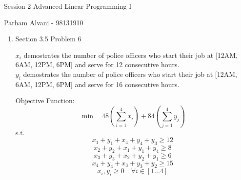 \documentclass{article}
\begin{document}
\large %


{\Large Session 2 %
\hfill  Advanced Linear Programming I}

\begin{center}
{\Large Parham Alvani - 98131910} %
\end{center}
\vspace{0.05in}


\begin{enumerate}

\item Section 3.5 Problem 6
\par
\(x_i\) demostrates the number of police officers who start their job at [12AM, 6AM, 12PM, 6PM] and serve for 12 consecutive hours.\\
\(y_i\) demostrates the number of police officers who start their job at [12AM, 6AM, 12PM, 6PM] and serve for 16 consecutive hours.
\par
Objective Function:
\[
    \min\quad48(\sum_{i=1}^{4}x_i) + 84(\sum_{j=1}^4y_j)
\]
s.t.
\[
    x_1 + y_1 + x_4 + y_4 + y_3 \ge 12
\]
\[
    x_2 + y_2 + x_1 + y_1 + y_4 \ge 8
\]
\[
    x_3 + y_3 + x_2 + y_2 + y_1 \ge 6
\]
\[
    x_4 + y_4 + x_3 + y_3 + y_2 \ge 15
\]
\[
    x_i,y_i \ge 0 \quad\forall i \in [1\dots4]
\]

\end{enumerate}

\end{document}
